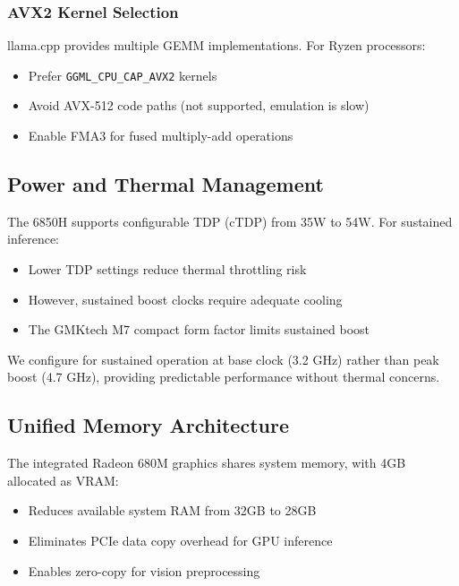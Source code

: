 \subsubsection{AVX2 Kernel Selection}

llama.cpp provides multiple GEMM implementations. For Ryzen processors:

\begin{itemize}
    \item Prefer \texttt{GGML\_CPU\_CAP\_AVX2} kernels
    \item Avoid AVX-512 code paths (not supported, emulation is slow)
    \item Enable FMA3 for fused multiply-add operations
\end{itemize}

\subsection{Power and Thermal Management}

The 6850H supports configurable TDP (cTDP) from 35W to 54W. For sustained inference:

\begin{itemize}
    \item Lower TDP settings reduce thermal throttling risk
    \item However, sustained boost clocks require adequate cooling
    \item The GMKtech M7 compact form factor limits sustained boost
\end{itemize}

We configure for sustained operation at base clock (3.2 GHz) rather than peak boost (4.7 GHz), providing predictable performance without thermal concerns.

\subsection{Unified Memory Architecture}

The integrated Radeon 680M graphics shares system memory, with 4GB allocated as VRAM:

\begin{itemize}
    \item Reduces available system RAM from 32GB to 28GB
    \item Eliminates PCIe data copy overhead for GPU inference
    \item Enables zero-copy for vision preprocessing
\end{itemize}

